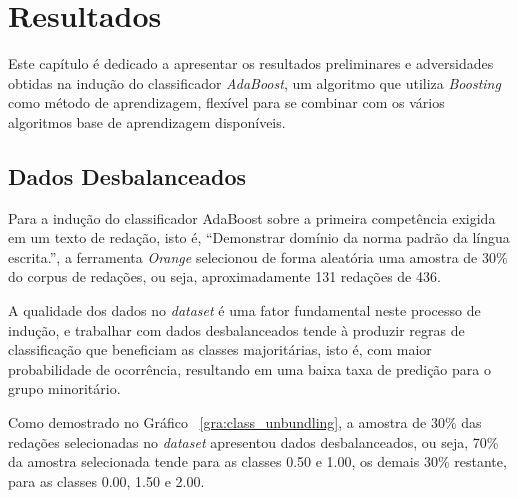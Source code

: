 \section{Resultados}

Este capítulo é dedicado a apresentar os resultados preliminares e adversidades obtidas na indução do classificador \textit{AdaBoost}, um algoritmo que utiliza \textit{Boosting} como método de aprendizagem, flexível para se combinar com os vários algoritmos base de aprendizagem disponíveis.

\subsection{Dados Desbalanceados}

Para a indução do classificador AdaBoost sobre a primeira competência exigida em um texto de redação, isto é,  ``Demonstrar domínio da norma padrão da língua escrita.'', a ferramenta \textit{Orange} selecionou de forma aleatória uma amostra de 30\% do corpus de redações, ou seja, aproximadamente 131 redações de 436. 

A qualidade dos dados no \textit{dataset} é uma fator fundamental neste processo de indução, e trabalhar com dados desbalanceados tende à produzir regras de classificação que beneficiam as classes majoritárias, isto é, com maior probabilidade de ocorrência, resultando em uma baixa taxa de predição para o grupo minoritário.

Como demostrado no Gráfico ~\ref{gra:class_unbundling}, a amostra de 30\% das redações selecionadas no \textit{dataset} apresentou dados desbalanceados, ou seja, 70\% da amostra selecionada tende para as classes 0.50 e 1.00, os demais 30\% restante, para as classes 0.00, 1.50 e 2.00. 

\mydata


